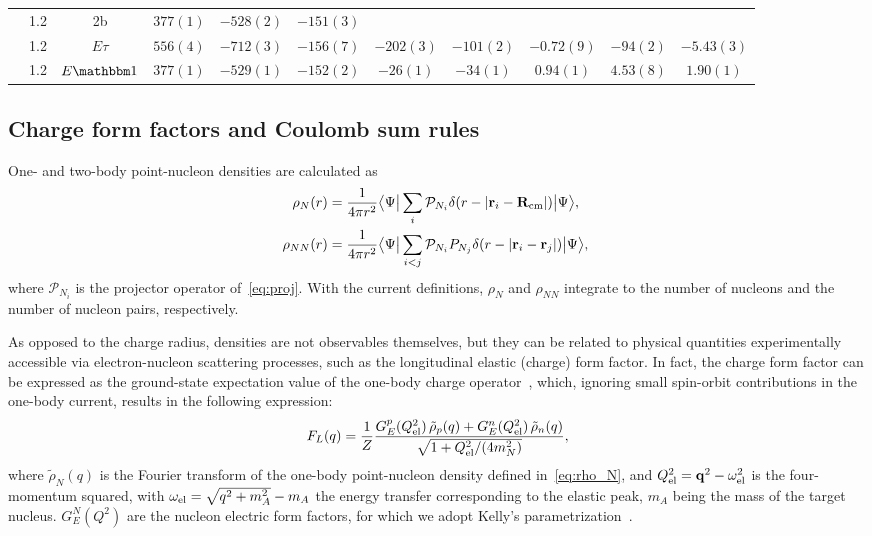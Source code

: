 \documentclass[aps,prc,twocolumn,superscriptaddress,floatfix]{revtex4-1}
\begin{document}
\begin{table}[htb]
\begin{tabular}{ccccccccccc}
                & 1.2 & 2b           & $377(1)$      & $-528(2)$   & $-151(3)$            &            &              &              &            &            \\
                & 1.2 & $E\tau$      & $556(4)$      & $-712(3)$   & $-156(7)$            & $-202(3)$  & $-101(2)$    & $-0.72(9)$   & $-94(2)$   & $-5.43(3)$ \\
                & 1.2 & $E\mathbbm1$ & $377(1)$      & $-529(1)$   & $-152(2)$            & $-26(1)$   & $-34(1)$     & $0.94(1)$    & $4.53(8)$  & $1.90(1)$  \\
\hline\hline
\end{tabular}
\label{tab:v3}
\end{table}
\setlength{\tabcolsep}{10pt}


\subsection{Charge form factors and Coulomb sum rules}
One- and two-body point-nucleon densities are calculated as
\begin{align}
	\!\!\rho_{N}(r) &=\frac{1}{4\pi r^2}\big\langle\Psi\big|\sum_i    \mathcal P_{N_i}\delta(r-|\vb{r}_i-\vb{R}_{\rm cm}|)\big|\Psi\big\rangle, \label{eq:rho_N} \\
	\!\!\rho_{NN}(r)&=\frac{1}{4\pi r^2}\big\langle\Psi\big|\sum_{i<j}\mathcal P_{N_i}P_{N_j}\delta(r-|\vb{r}_i-\vb{r}_j|)\big|\Psi\big\rangle, \label{eq:rho_NN}
\end{align}
where $\mathcal P_{N_i}$ is the projector operator of~\cref{eq:proj}.
With the current definitions, $\rho_N$ and $\rho_{NN}$ integrate to the number 
of nucleons and the number of nucleon pairs, respectively.

As opposed to the charge radius, densities are not observables themselves, 
but they can be related to physical quantities experimentally accessible via 
electron-nucleon scattering processes, such as the longitudinal elastic (charge) form factor.
In fact, the charge form factor can be expressed as the ground-state expectation value of 
the one-body charge operator~\cite{Mcvoy:1962},
which, ignoring small spin-orbit contributions in the one-body current, 
results in the following expression:
\begin{align}
	F_L(q)=\frac{1}{Z}\frac{G_E^p(Q_{\rm el}^2)\,\tilde{\rho}_p(q)+G_E^n(Q_{\rm el}^2)\,\tilde{\rho}_n(q)}{\sqrt{1+Q_{\rm el}^2/(4 m_N^2)}},
	\label{eq:ff}
\end{align}
where $\tilde{\rho}_{N}(q)$ is the Fourier transform of the one-body point-nucleon density defined in~\cref{eq:rho_N}, 
and $Q^2_{\rm el}=\vb{q}^2-\omega_{\rm el}^2$ is the four-momentum squared, 
with $\omega_{\rm el}=\sqrt{q^2+m_A^2}-m_A$ the energy transfer corresponding to the elastic peak,
$m_A$ being the mass of the target nucleus.
$G_E^N(Q^2)$ are the nucleon electric form factors, for which we adopt Kelly's parametrization~\cite{Kelly:2004}.
\end{document}
